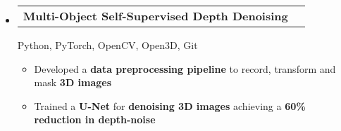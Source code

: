 \documentclass[letterpaper,11pt]{article}
\makeatletter
\newcounter{starnumber}
\newcommand{\stars}[1]{
  \forloop{starnumber}{1}{\value{starnumber} < 4}{
    \ifthenelse{#1 < \value{starnumber}}{\ding{73}}{\ding{72}}%
  }
}
\newcommand{\resumeItem}[1]{
  \item\small{
    {#1 \vspace{-2pt}}
  }
}
\newcommand{\resumeProjectHeading}[2]{
    \item
    \begin{tabular*}{0.97\textwidth}{l@{\extracolsep{\fill}}r}
      \small#1 & #2 \\
    \end{tabular*}\vspace{-7pt}
}
\newcommand{\resumeSubHeadingListStart}{\begin{itemize}[leftmargin=0.15in, label={}]}
\newcommand{\resumeSubHeadingListEnd}{\end{itemize}}
\newcommand{\resumeItemListStart}{\begin{itemize}[leftmargin=0.2in]}
\newcommand{\resumeItemListEnd}{\end{itemize}\vspace{-5pt}}
\makeatother
\begin{document}
\resumeSubHeadingListStart
\vspace{5pt}
\resumeProjectHeading
{\textbf{Multi-Object Self-Supervised Depth Denoising} \space {[Kienle \& Petri, 2022, arXiv:2305.05778]}\vspace{8pt}}{}
{\small{Python, PyTorch, OpenCV, Open3D, Git}}
\vspace*{-5pt}
\resumeItemListStart
\resumeItem{Developed a \textbf{data preprocessing pipeline} to record, transform and mask \textbf{3D images}}
\resumeItem{Trained a \textbf{U-Net} for \textbf{denoising 3D images} achieving a \textbf{60\% reduction in depth-noise}}
\resumeItemListEnd

\resumeSubHeadingListEnd

\vspace*{-5pt}

                
                
\end{document}
